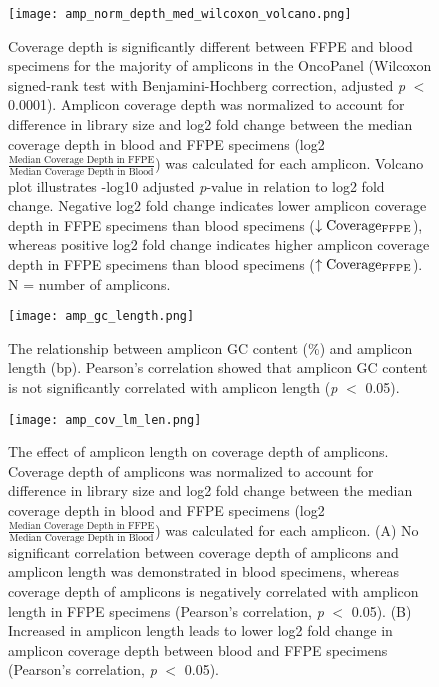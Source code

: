 \begin{figure}[H]
	\centering
	\texttt{[image: amp\_norm\_depth\_med\_wilcoxon\_volcano.png]}
	\caption{Coverage depth is significantly different between FFPE and blood specimens for the majority of amplicons in the OncoPanel (Wilcoxon signed-rank test with Benjamini-Hochberg correction, adjusted \textit{p} $<$ 0.0001). Amplicon coverage depth was normalized to account for difference in library size and log2 fold change between the median coverage depth in blood and FFPE specimens (log2\( \frac{\text{Median Coverage Depth in FFPE}}{\text{Median Coverage Depth in Blood}} \)) was calculated for each amplicon. Volcano plot illustrates -log10 adjusted \textit{p}-value in relation to log2 fold change. Negative log2 fold change indicates lower amplicon coverage depth in FFPE specimens than blood specimens ($\downarrow \text{Coverage\textsubscript{FFPE}}$), whereas positive log2 fold change indicates higher amplicon coverage depth in FFPE specimens than blood specimens ($\uparrow\text{Coverage\textsubscript{FFPE}}$). N = number of amplicons.}
	\label{fig:amp_norm_depth_med_wilcoxon_volcano}
\end{figure}


\begin{figure}[H]
	\centering
	\texttt{[image: amp\_gc\_length.png]}
	\caption{The relationship between amplicon GC content (\%) and amplicon length (bp). Pearson's correlation showed that amplicon GC content is not significantly correlated with amplicon length (\textit{p} $<$ 0.05).}
	\label{fig:amp_gc_length}
\end{figure}


\begin{figure}[H]
	\centering
	\texttt{[image: amp\_cov\_lm\_len.png]}
	\caption{The effect of amplicon length on coverage depth of amplicons. Coverage depth of amplicons was normalized to account for difference in library size and log2 fold change between the median coverage depth in blood and FFPE specimens (log2\( \frac{\text{Median Coverage Depth in FFPE}}{\text{Median Coverage Depth in Blood}} \)) was calculated for each amplicon. (A) No significant correlation between coverage depth of amplicons and amplicon length was demonstrated in blood specimens, whereas coverage depth of amplicons is negatively correlated with amplicon length in FFPE specimens (Pearson's correlation, \textit{p} $<$ 0.05). (B) Increased in amplicon length leads to lower log2 fold change in amplicon coverage depth between blood and FFPE specimens (Pearson's correlation, \textit{p} $<$ 0.05).}
	\label{fig:amp_cov_lm_len}
\end{figure}

